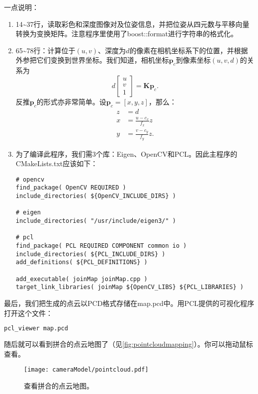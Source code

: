 一点说明：
\begin{enumerate}
	\item 14\textasciitilde37行，读取彩色和深度图像对及位姿信息，并把位姿从四元数与平移向量转换为变换矩阵。注意程序里使用了boost::format进行字符串的格式化。
	\item 65\textasciitilde78行：计算位于$(u,v)$、深度为$d$的像素在相机坐标系下的位置，并根据外参把它们变换到世界坐标。我们知道，相机坐标$\bm{p}_c$到像素坐标$(u,v,d)$的关系为
	\begin{equation}
	d\left[ \begin{array}{l}
	u\\
	v\\
	1
	\end{array} \right] = \bm{K} \bm{p}_c.
	\end{equation}
	反推$\bm{p}_c$的形式亦非常简单。设$\bm{p}_c=[x,y,z]$，那么：
	\begin{align*}
	z &= d \\
	x &= \frac{{u - {c_x}}}{{{f_x}}}z\\
	y &= \frac{{v - {c_y}}}{{{f_y}}}z.
	\end{align*}
	
	\item 为了编译此程序，我们需3个库：Eigen、OpenCV和PCL。因此主程序的CMakeLists.txt应该如下：
\begin{lstlisting}
# opencv 
find_package( OpenCV REQUIRED )
include_directories( ${OpenCV_INCLUDE_DIRS} )

# eigen 
include_directories( "/usr/include/eigen3/" )

# pcl 
find_package( PCL REQUIRED COMPONENT common io )
include_directories( ${PCL_INCLUDE_DIRS} )
add_definitions( ${PCL_DEFINITIONS} )

add_executable( joinMap joinMap.cpp )
target_link_libraries( joinMap ${OpenCV_LIBS} ${PCL_LIBRARIES} )
\end{lstlisting}
\end{enumerate}

最后，我们把生成的点云以PCD格式存储在map.pcd中。用PCL提供的可视化程序打开这个文件：

\begin{lstlisting}[language=sh]
pcl_viewer map.pcd
\end{lstlisting}

随后就可以看到拼合的点云地图了（见\autoref{fig:pointcloudmapping}）。你可以拖动鼠标查看。

\begin{figure}[!htp]
	\centering
	\texttt{[image: cameraModel/pointcloud.pdf]}
	\caption{查看拼合的点云地图。}
	\label{fig:pointcloudmapping}
\end{figure}

